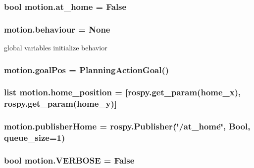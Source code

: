 \subsubsection[{\texorpdfstring{at\+\_\+home}{at_home}}]{\setlength{\rightskip}{0pt plus 5cm}bool motion.\+at\+\_\+home = False}\hypertarget{namespacemotion_a30e58643e988d1faddb84cdfd54965f8}{}\label{namespacemotion_a30e58643e988d1faddb84cdfd54965f8}
\subsubsection[{\texorpdfstring{behaviour}{behaviour}}]{\setlength{\rightskip}{0pt plus 5cm}motion.\+behaviour = None}\hypertarget{namespacemotion_a15d63b2a70ac940f179085ce72871c86}{}\label{namespacemotion_a15d63b2a70ac940f179085ce72871c86}


global variables initialize behavior 

\subsubsection[{\texorpdfstring{goal\+Pos}{goalPos}}]{\setlength{\rightskip}{0pt plus 5cm}motion.\+goal\+Pos = Planning\+Action\+Goal()}\hypertarget{namespacemotion_ae8b88cad0f3d7ca1b77eb860276cc939}{}\label{namespacemotion_ae8b88cad0f3d7ca1b77eb860276cc939}
\subsubsection[{\texorpdfstring{home\+\_\+position}{home_position}}]{\setlength{\rightskip}{0pt plus 5cm}list motion.\+home\+\_\+position = \mbox{[}rospy.\+get\+\_\+param(\textquotesingle{}home\+\_\+x\textquotesingle{}), rospy.\+get\+\_\+param(\textquotesingle{}home\+\_\+y\textquotesingle{})\mbox{]}}\hypertarget{namespacemotion_aa995e8257b20bb286a59bf6bb3c5f375}{}\label{namespacemotion_aa995e8257b20bb286a59bf6bb3c5f375}
\subsubsection[{\texorpdfstring{publisher\+Home}{publisherHome}}]{\setlength{\rightskip}{0pt plus 5cm}motion.\+publisher\+Home = rospy.\+Publisher(\char`\"{}/at\+\_\+home\char`\"{}, Bool, queue\+\_\+size=1)}\hypertarget{namespacemotion_a53c0565e9a198f8fa203ac95f441255b}{}\label{namespacemotion_a53c0565e9a198f8fa203ac95f441255b}
\subsubsection[{\texorpdfstring{V\+E\+R\+B\+O\+SE}{VERBOSE}}]{\setlength{\rightskip}{0pt plus 5cm}bool motion.\+V\+E\+R\+B\+O\+SE = False}\hypertarget{namespacemotion_a9f9cd0f38a0aad33b5304b4edef120cd}{}\label{namespacemotion_a9f9cd0f38a0aad33b5304b4edef120cd}
